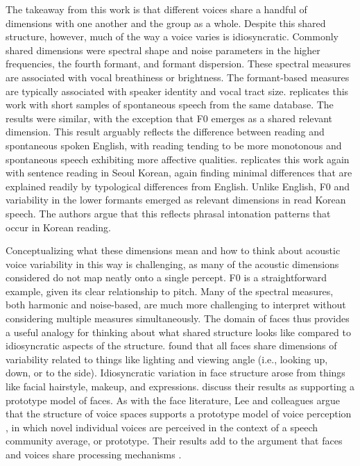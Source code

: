 
The takeaway from this work is that different voices share a handful of dimensions with one another and the group as a whole. Despite this shared structure, however, much of the way a voice varies is idiosyncratic. Commonly shared dimensions were spectral shape and noise parameters in the higher frequencies, the fourth formant, and formant dispersion. These spectral measures are associated with vocal breathiness or brightness. The formant-based measures are typically associated with speaker identity and vocal tract size. \citet{lee_2019_spontaneous} replicates this work with short samples of spontaneous speech from the same database. The results were similar, with the exception that F0 emerges as a shared relevant dimension. This result arguably reflects the difference between reading and spontaneous spoken English, with reading tending to be more monotonous and spontaneous speech exhibiting more affective qualities. \citet{lee_2020_language} replicates this work again with sentence reading in Seoul Korean, again finding minimal differences that are explained readily by typological differences from English. Unlike English, F0 and variability in the lower formants emerged as relevant dimensions in read Korean speech. The authors argue that this reflects phrasal intonation patterns that occur in Korean reading. 

Conceptualizing what these dimensions mean and how to think about acoustic voice variability in this way is challenging, as many of the acoustic dimensions considered do not map neatly onto a single percept. F0 is a straightforward example, given its clear relationship to pitch. Many of the spectral measures, both harmonic and noise-based, are much more challenging to interpret without considering multiple measures simultaneously. The domain of faces thus provides a useful analogy for thinking about what shared structure looks like compared to idiosyncratic aspects of the structure. \citet{burton_2016_faces} found that all faces share dimensions of variability related to things like lighting and viewing angle (i.e., looking up, down, or to the side). Idiosyncratic variation in face structure arose from things like facial hairstyle, makeup, and expressions. \citet{burton_2016_faces} discuss their results as supporting a prototype model of faces. As with the face literature, Lee and colleagues argue that the structure of voice spaces supports a prototype model of voice perception \citep{lavner_2001_prototype, latinus_2011_voice}, in which novel individual voices are perceived in the context of a speech community average, or prototype. Their results add to the argument that faces and voices share processing mechanisms \citep{yovel_2013_unified}.


